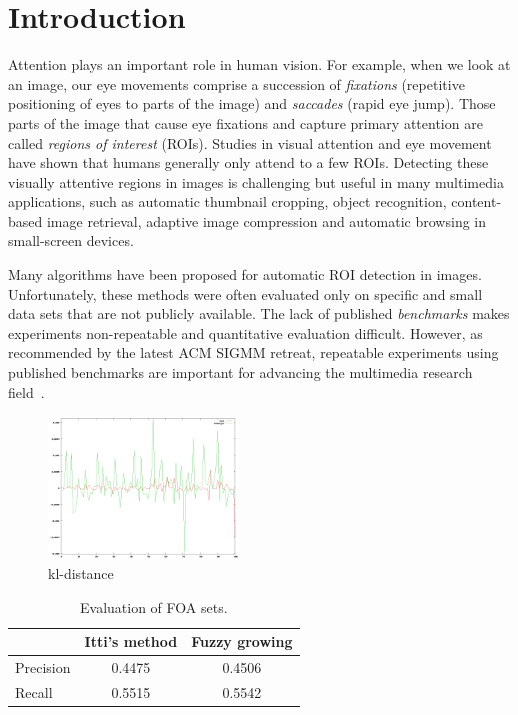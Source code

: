 \chapter{Introduction}
\label{c:intro}

Attention plays an important role in human vision. For example, when
we look at an image, our eye movements comprise a succession of {\em
fixations} (repetitive positioning of eyes to parts of the image)
and {\em saccades} (rapid eye jump). Those parts of the image that
cause eye fixations and capture primary attention are called {\em
regions of interest} (ROIs). Studies in visual attention and eye
movement have shown that humans generally only attend to a few ROIs.
Detecting these visually attentive regions in images is challenging
but useful in many multimedia applications, such as automatic
thumbnail cropping, object recognition, content-based image
retrieval, adaptive image compression and automatic browsing in
small-screen devices.

Many algorithms have been proposed for automatic ROI detection in
images. Unfortunately, these methods were often evaluated only on
specific and small data sets that are not publicly available. The
lack of published {\em benchmarks} makes experiments non-repeatable
and quantitative evaluation difficult. However, as recommended by
the latest ACM SIGMM retreat, repeatable experiments using published
benchmarks are important for advancing the multimedia research
field~\cite{Rowe:2005:ASR}.

\begin{figure}
\centering
\includegraphics[width=0.45\textwidth]{pics/kl.png}
\caption{kl-distance}
\label{kl}
\end{figure}

\begin{table}[t]
\begin{center}
\begin{tabular}{lcc}

\hline
                    &  {\small Itti's method}     & {\small Fuzzy growing}    \\
\hline
{\small Precision}           &  0.4475    & 0.4506 \\
{\small Recall}              &  0.5515    & 0.5542 \\
\hline

\end{tabular}
\caption[Evaluation of FOA sets]{\small Evaluation of FOA sets. } \label{t:FOA}
\end{center}
\end{table}
